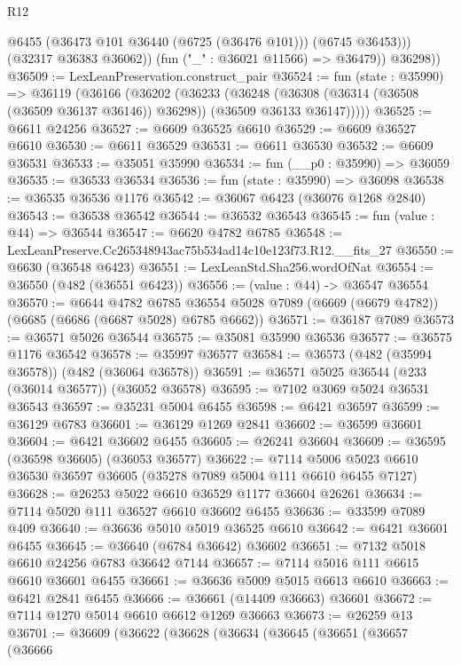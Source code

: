 \begin{lexlean}{R12}
\begin{coremodule}
                @6455
                (@36473 @101 @36440 (@6725 (@36476 @101)))
                (@6745 @36453)))
            (@32317 @36383 @36062))
          (fun ("_" : @36021 @11566) => @36479))
        @36298))
@36509 := LexLeanPreservation.construct_pair
@36524 := fun (state : @35990) =>
  @36119
    (@36166
      (@36202
        (@36233
          (@36248
            (@36308 (@36314 (@36508 (@36509 @36137 @36146)) @36298))
            (@36509 @36133 @36147)))))
@36525 := @6611 @24256
@36527 := @6609 @36525 @6610
@36529 := @6609 @36527 @6610
@36530 := @6611 @36529
@36531 := @6611 @36530
@36532 := @6609 @36531
@36533 := @35051 @35990
@36534 := fun (__p0 : @35990) => @36059
@36535 := @36533 @36534
@36536 := fun (state : @35990) => @36098
@36538 := @36535 @36536 @1176
@36542 := @36067 @6423 (@36076 @1268 @2840)
@36543 := @36538 @36542
@36544 := @36532 @36543
@36545 := fun (value : @44) => @36544
@36547 := @6620 @4782 @6785
@36548 := LexLeanPreserve.Cc265348943ac75b534ad14c10e123f73.R12.__fits_27
@36550 := @6630 (@36548 @6423)
@36551 := LexLeanStd.Sha256.wordOfNat
@36554 := @36550 (@482 (@36551 @6423))
@36556 := (value : @44) -> @36547 @36554
@36570 := @6644
    @4782
    @6785
    @36554
    @5028
    @7089
    (@6669 (@6679 @4782))
    (@6685 (@6686 (@6687 @5028) @6785 @6662))
@36571 := @36187 @7089
@36573 := @36571 @5026 @36544
@36575 := @35081 @35990 @36536
@36577 := @36575 @1176 @36542
@36578 := @35997 @36577
@36584 := @36573 (@482 (@35994 @36578)) (@482 (@36064 @36578))
@36591 := @36571 @5025 @36544 (@233 (@36014 @36577)) (@36052 @36578)
@36595 := @7102 @3069 @5024 @36531 @36543
@36597 := @35231 @5004 @6455
@36598 := @6421 @36597
@36599 := @36129 @6783
@36601 := @36129 @1269 @2841
@36602 := @36599 @36601
@36604 := @6421 @36602 @6455
@36605 := @26241 @36604
@36609 := @36595 (@36598 @36605) (@36053 @36577)
@36622 := @7114 @5006 @5023 @6610 @36530 @36597 @36605 (@35278 @7089 @5004 @111 @6610 @6455 @7127)
@36628 := @26253 @5022 @6610 @36529 @1177 @36604 @26261
@36634 := @7114 @5020 @111 @36527 @6610 @36602 @6455
@36636 := @33599 @7089 @409
@36640 := @36636 @5010 @5019 @36525 @6610
@36642 := @6421 @36601 @6455
@36645 := @36640 (@6784 @36642) @36602
@36651 := @7132 @5018 @6610 @24256 @6783 @36642 @7144
@36657 := @7114 @5016 @111 @6615 @6610 @36601 @6455
@36661 := @36636 @5009 @5015 @6613 @6610
@36663 := @6421 @2841 @6455
@36666 := @36661 (@14409 @36663) @36601
@36672 := @7114 @1270 @5014 @6610 @6612 @1269 @36663
@36673 := @26259 @13
@36701 := @36609
    (@36622
      (@36628
        (@36634
          (@36645
            (@36651
              (@36657
                (@36666

\end{coremodule}
\end{lexlean}
